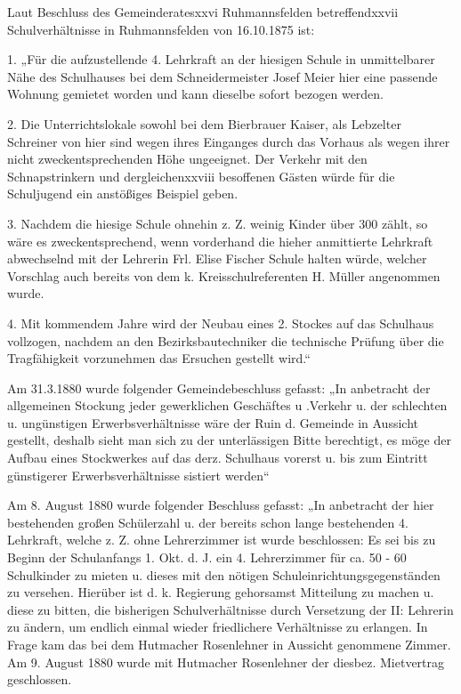 \documentclass[12pt,a4paper]{book}
\begin{document}
Laut Beschluss des Gemeinderatesxxvi Ruhmannsfelden betreffendxxvii
Schulverhältnisse in Ruhmannsfelden von 16.10.1875 ist:



1. „Für die aufzustellende 4. Lehrkraft an der hiesigen Schule in unmittelbarer
Nähe des Schulhauses bei dem Schneidermeister Josef Meier hier eine passende
Wohnung gemietet worden und kann dieselbe sofort bezogen werden.

2. Die Unterrichtslokale sowohl bei dem Bierbrauer Kaiser, als Lebzelter
Schreiner von hier sind wegen ihres Einganges durch das Vorhaus als wegen ihrer
nicht zweckentsprechenden Höhe ungeeignet. Der Verkehr mit den Schnapstrinkern
und dergleichenxxviii besoffenen Gästen würde für die Schuljugend ein anstößiges
Beispiel geben.

3. Nachdem die hiesige Schule ohnehin z. Z. weinig Kinder über 300 zählt, so
wäre es zweckentsprechend, wenn vorderhand die hieher anmittierte Lehrkraft
abwechselnd mit der Lehrerin Frl. Elise Fischer Schule halten würde, welcher
Vorschlag auch bereits von dem k. Kreisschulreferenten H. Müller angenommen
wurde.

4. Mit kommendem Jahre wird der Neubau eines 2. Stockes auf das Schulhaus
vollzogen, nachdem an den Bezirksbautechniker die technische Prüfung über die
Tragfähigkeit vorzunehmen das Ersuchen gestellt wird.“



Am 31.3.1880 wurde folgender Gemeindebeschluss gefasst: „In anbetracht der
allgemeinen Stockung jeder gewerklichen Geschäftes u .Verkehr u. der schlechten
u. ungünstigen Erwerbsverhältnisse wäre der Ruin d. Gemeinde in Aussicht
gestellt, deshalb sieht man sich zu der unterlässigen Bitte berechtigt, es möge
der Aufbau eines Stockwerkes auf das derz. Schulhaus vorerst u. bis zum Eintritt
günstigerer Erwerbsverhältnisse sistiert werden“

Am 8. August 1880 wurde folgender Beschluss gefasst: „In anbetracht der hier
bestehenden großen Schülerzahl u. der bereits schon lange bestehenden 4.
Lehrkraft, welche z. Z. ohne Lehrerzimmer ist wurde beschlossen: Es sei bis zu
Beginn der Schulanfangs 1. Okt. d. J. ein 4. Lehrerzimmer für ca. 50 - 60
Schulkinder zu mieten u. dieses mit den nötigen Schuleinrichtungsgegenständen zu
versehen. Hierüber ist d. k. Regierung gehorsamst Mitteilung zu machen u. diese
zu bitten, die bisherigen Schulverhältnisse durch Versetzung der II: Lehrerin zu
ändern, um endlich einmal wieder friedlichere Verhältnisse zu erlangen. In Frage
kam das bei dem Hutmacher Rosenlehner in Aussicht genommene Zimmer. Am 9. August
1880 wurde mit Hutmacher Rosenlehner der diesbez. Mietvertrag geschlossen.
\end{document}
